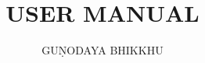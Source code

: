 \documentclass[]{Abhidhammāvatāra} %
\title{\textbf{USER MANUAL}} %
\author{GUṆODAYA BHIKKHU}
\date{} %
\begin{document}

\frontmatter

\maketitle %
\cleardoublepage %




\setcounter{tocdepth}{0} %
\renewcommand{\contentsname}{Brief Contents} %
\tableofcontents %

\renewcommand{\contentsname}{Detailed Contents} %




\mainmatter


\end{document}
